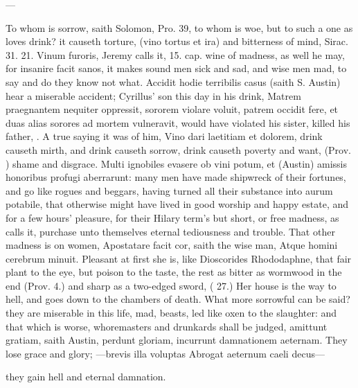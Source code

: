 {---

To whom is sorrow, saith Solomon, Pro.  39, to whom is woe, but
to such a one as loves drink? it causeth torture, (vino tortus et ira)
and bitterness of mind, Sirac. 31. 21. Vinum furoris, Jeremy calls it,
15. cap. wine of madness, as well he may, for insanire facit sanos, it
makes sound men sick and sad, and wise men mad, to say and do
they know not what. Accidit hodie terribilis casus (saith S.
Austin) hear a miserable accident; Cyrillus' son this day in his drink,
Matrem praegnantem nequiter oppressit, sororem violare voluit, patrem
occidit fere, et duas alias sorores ad mortem vulneravit, would have
violated his sister, killed his father, \etc{}. A true saying it was of
him, Vino dari laetitiam et dolorem, drink causeth mirth, and drink
causeth sorrow, drink causeth poverty and want, (Prov. ) shame and
disgrace. Multi ignobiles evasere ob vini potum, et (Austin) amissis
honoribus profugi aberrarunt: many men have made shipwreck of their
fortunes, and go like rogues and beggars, having turned all their
substance into aurum potabile, that otherwise might have lived in good
worship and happy estate, and for a few hours' pleasure, for their
Hilary term's but short, or free madness, as \Seneca calls it,
purchase unto themselves eternal tediousness and trouble.
That other madness is on women, Apostatare facit cor, saith the wise
man, Atque homini cerebrum minuit. Pleasant at first she is, like
Dioscorides Rhododaphne, that fair plant to the eye, but poison to the
taste, the rest as bitter as wormwood in the end (Prov.  4.) and
sharp as a two-edged sword, ( 27.) Her house is the way to hell,
and goes down to the chambers of death. What more sorrowful can be
said? they are miserable in this life, mad, beasts, led like oxen
to the slaughter: and that which is worse, whoremasters and drunkards
shall be judged, amittunt gratiam, saith Austin, perdunt gloriam,
incurrunt damnationem aeternam. They lose grace and glory;
---brevis illa voluptas
Abrogat aeternum caeli decus---

they gain hell and eternal damnation.

}
